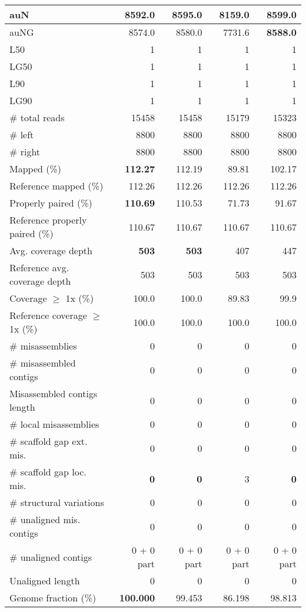\documentclass[12pt,a4paper]{article}
\begin{document}
\begin{table}[ht]
\begin{center}
\begin{tabular}{|l*{4}{|r}|}
auN & 8592.0 & 8595.0 & 8159.0 & {\bf 8599.0} \\ \hline
auNG & 8574.0 & 8580.0 & 7731.6 & {\bf 8588.0} \\ \hline
L50 & 1 & 1 & 1 & 1 \\ \hline
LG50 & 1 & 1 & 1 & 1 \\ \hline
L90 & 1 & 1 & 1 & 1 \\ \hline
LG90 & 1 & 1 & 1 & 1 \\ \hline
\# total reads & 15458 & 15458 & 15179 & 15323 \\ \hline
\# left & 8800 & 8800 & 8800 & 8800 \\ \hline
\# right & 8800 & 8800 & 8800 & 8800 \\ \hline
Mapped (\%) & {\bf 112.27} & 112.19 & 89.81 & 102.17 \\ \hline
Reference mapped (\%) & 112.26 & 112.26 & 112.26 & 112.26 \\ \hline
Properly paired (\%) & {\bf 110.69} & 110.53 & 71.73 & 91.67 \\ \hline
Reference properly paired (\%) & 110.67 & 110.67 & 110.67 & 110.67 \\ \hline
Avg. coverage depth & {\bf 503} & {\bf 503} & 407 & 447 \\ \hline
Reference avg. coverage depth & 503 & 503 & 503 & 503 \\ \hline
Coverage $\geq$ 1x (\%) & 100.0 & 100.0 & 89.83 & 99.9 \\ \hline
Reference coverage $\geq$ 1x (\%) & 100.0 & 100.0 & 100.0 & 100.0 \\ \hline
\# misassemblies & 0 & 0 & 0 & 0 \\ \hline
\# misassembled contigs & 0 & 0 & 0 & 0 \\ \hline
Misassembled contigs length & 0 & 0 & 0 & 0 \\ \hline
\# local misassemblies & 0 & 0 & 0 & 0 \\ \hline
\# scaffold gap ext. mis. & 0 & 0 & 0 & 0 \\ \hline
\# scaffold gap loc. mis. & {\bf 0} & {\bf 0} & 3 & {\bf 0} \\ \hline
\# structural variations & 0 & 0 & 0 & 0 \\ \hline
\# unaligned mis. contigs & 0 & 0 & 0 & 0 \\ \hline
\# unaligned contigs & 0 + 0 part & 0 + 0 part & 0 + 0 part & 0 + 0 part \\ \hline
Unaligned length & 0 & 0 & 0 & 0 \\ \hline
Genome fraction (\%) & {\bf 100.000} & 99.453 & 86.198 & 98.813 \\ \hline

\end{tabular}
\end{center}
\end{table}
\end{document}
